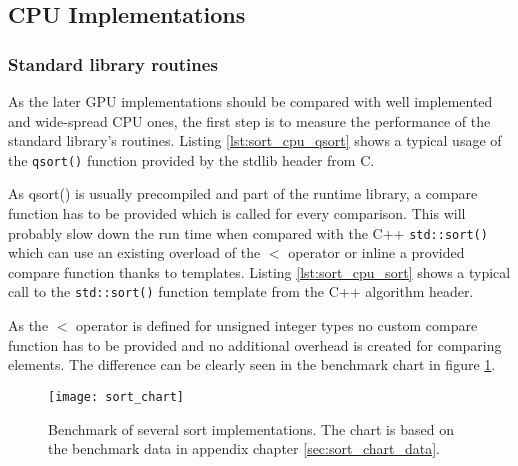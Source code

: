 \subsection{CPU Implementations}

\subsubsection{Standard library routines}

As the later GPU implementations should be compared with well implemented and wide-spread CPU ones, the first step is to measure the performance of the standard library's routines.
Listing \ref{lst:sort_cpu_qsort} shows a typical usage of the \lstinline|qsort()| function provided by the stdlib header from C.



As qsort() is usually precompiled and part of the runtime library, a compare function has to be provided which is called for every comparison. This will probably slow down the run time when compared with the C++ \lstinline!std::sort()! which can use an existing overload of the $<$ operator or inline a provided compare function thanks to templates.
Listing \ref{lst:sort_cpu_sort} shows a typical call to the \lstinline!std::sort()! function template from the C++ algorithm header.



As the $<$ operator is defined for unsigned integer types no custom compare function has to be provided and no additional overhead is created for comparing elements.
The difference can be clearly seen in the benchmark chart in figure \ref{fig:sort_chart}.

\begin{figure}
\centering
\texttt{[image: sort\_chart]}
\caption{Benchmark of several sort implementations. The chart is based on the benchmark data in appendix chapter \ref{sec:sort_chart_data}.}
\label{fig:sort_chart}
\end{figure}

